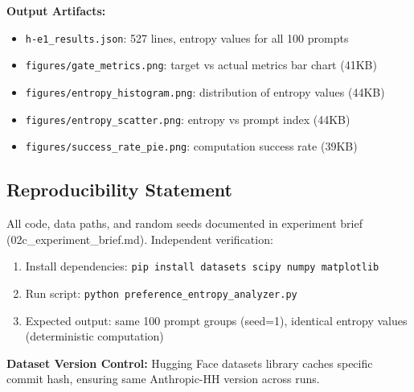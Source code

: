 \textbf{Output Artifacts:}
\begin{itemize}
\item \texttt{h-e1\_results.json}: 527 lines, entropy values for all 100 prompts
\item \texttt{figures/gate\_metrics.png}: target vs actual metrics bar chart (41KB)
\item \texttt{figures/entropy\_histogram.png}: distribution of entropy values (44KB)
\item \texttt{figures/entropy\_scatter.png}: entropy vs prompt index (44KB)
\item \texttt{figures/success\_rate\_pie.png}: computation success rate (39KB)
\end{itemize}

\subsection{Reproducibility Statement}

All code, data paths, and random seeds documented in experiment brief (02c\_experiment\_brief.md). Independent verification:
\begin{enumerate}
\item Install dependencies: \texttt{pip install datasets scipy numpy matplotlib}
\item Run script: \texttt{python preference\_entropy\_analyzer.py}
\item Expected output: same 100 prompt groups (seed=1), identical entropy values (deterministic computation)
\end{enumerate}

\textbf{Dataset Version Control:} Hugging Face datasets library caches specific commit hash, ensuring same Anthropic-HH version across runs.
